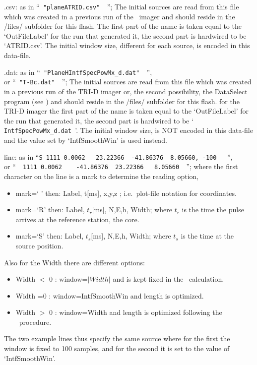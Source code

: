 \begin{enumerate*}
\item[.csv:]  as in ``\verb# "planeATRID.csv"  #''; The initial sources are read from this file which was created in a previous run of the \ATRID\ imager and should reside in the /files/ subfolder for this flash. The first part of the name is taken equal to the `OutFileLabel' for the run that generated it, the second part is hardwired to be `ATRID.csv'. The initial window size, different for each source, is encoded in this data-file.
\item[.dat:] as in ``\verb# "PlaneHIntfSpecPowMx_d.dat"  #'', \\or ``\verb# "T-Bc.dat"  #''; The initial sources are read from this file which was created in a previous run of the TRI-D imager or, the second possibility, the DataSelect program (see )  and should reside in the /files/ subfolder for this flash. for the TRI-D imager the first part of the name is taken equal to the `OutFileLabel' for the run that generated it, the second part is hardwired to be `\verb# IntfSpecPowMx_d.dat #'. The initial window size, is NOT encoded in this data-file and the value set by `IntfSmoothWin' is used instead.
\item[line:] as in ``\verb#S 1111 0.0062   23.22366  -41.86376  8.05660, -100   #'', \\or ``\verb#  1111 0.0062    -41.86376  23.22366   8.05660  #''; where the first character on the line is a mark to determine the reading option,
    \begin{itemize}
      \item mark=` ' then: Label, t[ms], x,y,z ; i.e.\  plot-file notation for  coordinates.
      \item  mark=`R' then: Label, $t_r$[ms], N,E,h, Width; where $t_r$ is the time the pulse arrives at the reference station, the core.
      \item  mark=`S' then: Label, $t_s$[ms], N,E,h, Width; where $t_s$ is the time at the source position.
   \end{itemize}
   Also for the Width there are different options:
   \begin{itemize}
      \item Width $<$ 0 : window=$|Width|$ and is kept fixed in the \ATRID\ calculation.
      \item Width =0 : window=IntfSmoothWin and length is optimized.
      \item Width $>$ 0 : window=Width and length is optimized following the \ATRID\ procedure.
   \end{itemize}
   The two example lines thus specify the same source where for the first the window is fixed to 100 samples, and for the second it is set to the value of `IntfSmoothWin'.
\end{enumerate*}


